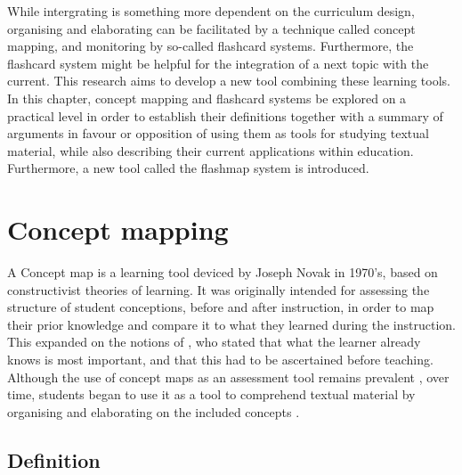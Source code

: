 While intergrating is something more dependent on the curriculum design, organising and elaborating can be facilitated by a technique called concept mapping, and monitoring by so-called flashcard systems. Furthermore, the flashcard system might be helpful for the integration of a next topic with the current. This research aims to develop a new tool combining these learning tools. In this chapter, concept mapping and flashcard systems be explored on a practical level in order to establish their definitions together with a summary of arguments in favour or opposition of using them as tools for studying textual material, while also describing their current applications within education. Furthermore, a new tool called the flashmap system is introduced.

\section{Concept mapping}

A Concept map is a learning tool deviced by Joseph Novak in 1970's, based on constructivist theories of learning. It was originally intended for assessing the structure of student conceptions, before and after instruction, in order to map their prior knowledge and compare it to what they learned during the instruction. This expanded on the notions of , who stated that what the learner already knows is most important, and that this had to be ascertained before teaching. Although the use of concept maps as an assessment tool remains prevalent \cite{canas, chung, hwang2, ruiz1}, over time, students began to use it as a tool to comprehend textual material by organising and elaborating on the included concepts \cite{canas, eppler, hwang2, karpicke2, nesbit}.

\subsection{Definition}

